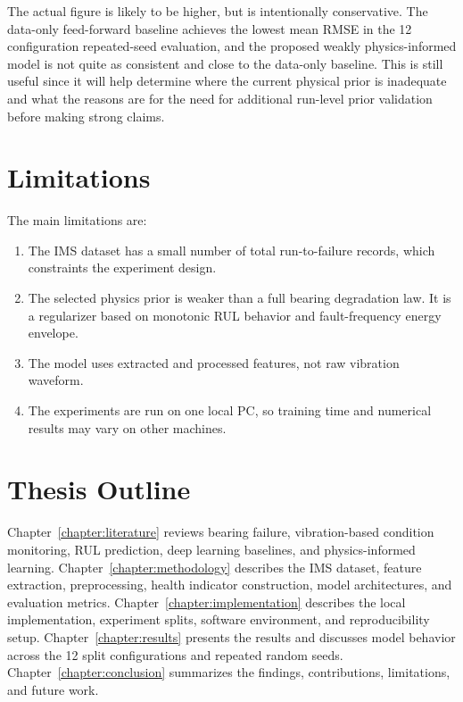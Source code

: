 The actual figure is likely to be higher, but is intentionally conservative. The data-only feed-forward baseline achieves the lowest mean RMSE in the 12 configuration repeated-seed evaluation, and the proposed weakly physics-informed model is not quite as consistent and close to the data-only baseline. This is still useful since it will help determine where the current physical prior is inadequate and what the reasons are for the need for additional run-level prior validation before making strong claims.
\section{Limitations}

The main limitations are:

\begin{enumerate}[label=\arabic*.]
    \item The IMS dataset has a small number of total run-to-failure records, which constraints the experiment design.
    \item The selected physics prior is weaker than a full bearing degradation law. It is a regularizer based on monotonic RUL behavior and fault-frequency energy envelope.
    \item The model uses extracted and processed features, not raw vibration waveform.
    \item The experiments are run on one local PC, so training time and numerical results may vary on other machines.
\end{enumerate}

\section{Thesis Outline}

Chapter~\ref{chapter:literature} reviews bearing failure, vibration-based condition monitoring, RUL prediction, deep learning baselines, and physics-informed learning. Chapter~\ref{chapter:methodology} describes the IMS dataset, feature extraction, preprocessing, health indicator construction, model architectures, and evaluation metrics. Chapter~\ref{chapter:implementation} describes the local implementation, experiment splits, software environment, and reproducibility setup. Chapter~\ref{chapter:results} presents the results and discusses model behavior across the 12 split configurations and repeated random seeds. Chapter~\ref{chapter:conclusion} summarizes the findings, contributions, limitations, and future work.

